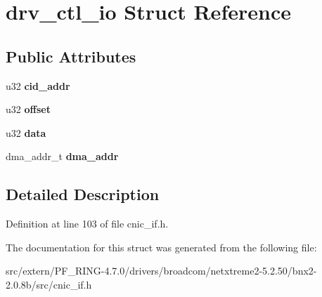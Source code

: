 \hypertarget{structdrv__ctl__io}{
\section{drv\_\-ctl\_\-io Struct Reference}
\label{structdrv__ctl__io}
}
\subsection*{Public Attributes}
\begin{DoxyCompactItemize}
\item 
\hypertarget{structdrv__ctl__io_abe8e07e291aba6d003a5816645cec916}{
u32 {\bfseries cid\_\-addr}}
\label{structdrv__ctl__io_abe8e07e291aba6d003a5816645cec916}

\item 
\hypertarget{structdrv__ctl__io_a902be935c3a4daee0c9f333ea85ee127}{
u32 {\bfseries offset}}
\label{structdrv__ctl__io_a902be935c3a4daee0c9f333ea85ee127}

\item 
\hypertarget{structdrv__ctl__io_af0b037b6908c4511534fdf5373ab6c19}{
u32 {\bfseries data}}
\label{structdrv__ctl__io_af0b037b6908c4511534fdf5373ab6c19}

\item 
\hypertarget{structdrv__ctl__io_a04ae4268d0efdbb71dd5498e5a2b13f0}{
dma\_\-addr\_\-t {\bfseries dma\_\-addr}}
\label{structdrv__ctl__io_a04ae4268d0efdbb71dd5498e5a2b13f0}

\end{DoxyCompactItemize}


\subsection{Detailed Description}


Definition at line 103 of file cnic\_\-if.h.



The documentation for this struct was generated from the following file:\begin{DoxyCompactItemize}
\item 
src/extern/PF\_\-RING-\/4.7.0/drivers/broadcom/netxtreme2-\/5.2.50/bnx2-\/2.0.8b/src/cnic\_\-if.h\end{DoxyCompactItemize}
